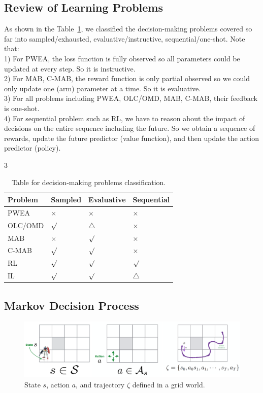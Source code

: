\documentclass[11pt]{article}
\begin{document}
\subsection{Review of Learning Problems}
As shown in the Table~\ref{table:decision_making}, we classified the decision-making problems covered so far into sampled/exhausted, evaluative/instructive, sequential/one-shot. 
Note that:\\
1) For PWEA, the loss function is fully observed so all parameters could be updated at every step. So it is instructive. \\
2) For MAB, C-MAB, the reward function is only partial observed so we could only update one (arm) parameter at a time. So it is evaluative.\\
3) For all problems including PWEA, OLC/OMD, MAB, C-MAB, their feedback is one-shot. \\
4) For sequential problem such as RL, we have to reason about the impact of decisions on the entire sequence including the future. So we obtain a sequence of rewards, update the future predictor (value function), and then update the action predictor (policy).
\begin{table}[]
3\centering
\begin{tabular}{|l|l|l|l|}
\hline
Problem & Sampled & Evaluative & Sequential \\ \hline
PWEA    &    $\times$     &      $\times$      &    $\times$        \\ \hline
OLC/OMD &    $\surd$     &      $\triangle$      &     $\times$       \\ \hline
MAB     &    $\times$     &      $\surd$       &     $\times$       \\ \hline
C-MAB   &    $\surd$     &       $\surd$      &      $\times$      \\ \hline
RL      &    $\surd$     &       $\surd$      &     $\surd$        \\ \hline
IL      &     $\surd$    &      $\surd$       &    $\triangle$        \\ \hline
\end{tabular}
\caption{Table for decision-making problems classification.}
\label{table:decision_making}
\end{table}

\subsection{Markov Decision Process}
\begin{figure}[htbp]
    \centering
\includegraphics[width=15cm]{imgs/Grid_World.png}
    \caption{State $s$, action $a$, and trajectory $\zeta$ defined in a grid world.}
    \label{fig:grid}
\end{figure} 
\end{document}
